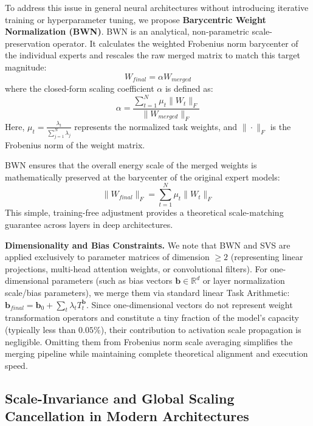 To address this issue in general neural architectures without introducing iterative training or hyperparameter tuning, we propose \textbf{Barycentric Weight Normalization (BWN)}. BWN is an analytical, non-parametric scale-preservation operator. It calculates the weighted Frobenius norm barycenter of the individual experts and rescales the raw merged matrix to match this target magnitude:
\begin{equation}
    W_{final} = \alpha W_{merged}
\end{equation}
where the closed-form scaling coefficient $\alpha$ is defined as:
\begin{equation}
    \alpha = \frac{\sum_{t=1}^N \mu_t \|W_t\|_F}{\|W_{merged}\|_F}
\end{equation}
Here, $\mu_t = \frac{\lambda_t}{\sum_{j=1}^N \lambda_j}$ represents the normalized task weights, and $\|\cdot\|_F$ is the Frobenius norm of the weight matrix. 

BWN ensures that the overall energy scale of the merged weights is mathematically preserved at the barycenter of the original expert models:
\begin{equation}
    \|W_{final}\|_F = \sum_{t=1}^N \mu_t \|W_t\|_F
\end{equation}
This simple, training-free adjustment provides a theoretical scale-matching guarantee across layers in deep architectures.

\textbf{Dimensionality and Bias Constraints.} We note that BWN and SVS are applied exclusively to parameter matrices of dimension $\ge 2$ (representing linear projections, multi-head attention weights, or convolutional filters). For one-dimensional parameters (such as bias vectors $\mathbf{b} \in \mathbb{R}^d$ or layer normalization scale/bias parameters), we merge them via standard linear Task Arithmetic: $\mathbf{b}_{final} = \mathbf{b}_0 + \sum_t \lambda_t T_t^{\mathbf{b}}$. Since one-dimensional vectors do not represent weight transformation operators and constitute a tiny fraction of the model's capacity (typically less than $0.05\%$), their contribution to activation scale propagation is negligible. Omitting them from Frobenius norm scale averaging simplifies the merging pipeline while maintaining complete theoretical alignment and execution speed.

\subsection{Scale-Invariance and Global Scaling Cancellation in Modern Architectures}
\label{sec:scale_invariance_proof}

